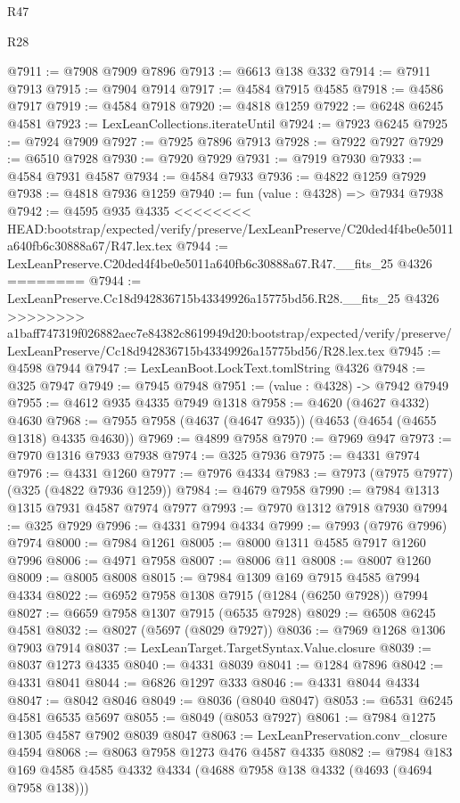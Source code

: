\begin{lexlean}{R47}
\begin{lexlean}{R28}
\begin{coremodule}
{{{{{{{{{{{{{{{{{{{{{{{{{{{{{{{{{{{{{{{{{{{{{{{{{{{{{{{{{{{{{{{{{{{{{{{{{{{{{{{{{{{{{{{{{{{{{{{{{{{{{{{{{{{{{{{{{{{{{{{{{{{{{{{{{{{{{@7911 := @7908 @7909 @7896
@7913 := @6613 @138 @332
@7914 := @7911 @7913
@7915 := @7904 @7914
@7917 := @4584 @7915 @4585
@7918 := @4586 @7917
@7919 := @4584 @7918
@7920 := @4818 @1259
@7922 := @6248 @6245 @4581
@7923 := LexLeanCollections.iterateUntil
@7924 := @7923 @6245
@7925 := @7924 @7909
@7927 := @7925 @7896 @7913
@7928 := @7922 @7927
@7929 := @6510 @7928
@7930 := @7920 @7929
@7931 := @7919 @7930
@7933 := @4584 @7931 @4587
@7934 := @4584 @7933
@7936 := @4822 @1259 @7929
@7938 := @4818 @7936 @1259
@7940 := fun (value : @4328) => @7934 @7938
@7942 := @4595 @935 @4335
<<<<<<<< HEAD:bootstrap/expected/verify/preserve/LexLeanPreserve/C20ded4f4be0e5011a640fb6c30888a67/R47.lex.tex
@7944 := LexLeanPreserve.C20ded4f4be0e5011a640fb6c30888a67.R47.__fits_25 @4326
========
@7944 := LexLeanPreserve.Cc18d942836715b43349926a15775bd56.R28.__fits_25 @4326
>>>>>>>> a1baff747319f026882aec7e84382c8619949d20:bootstrap/expected/verify/preserve/LexLeanPreserve/Cc18d942836715b43349926a15775bd56/R28.lex.tex
@7945 := @4598 @7944
@7947 := LexLeanBoot.LockText.tomlString @4326
@7948 := @325 @7947
@7949 := @7945 @7948
@7951 := (value : @4328) -> @7942 @7949
@7955 := @4612 @935 @4335 @7949 @1318
@7958 := @4620 (@4627 @4332) @4630
@7968 := @7955 @7958 (@4637 (@4647 @935)) (@4653 (@4654 (@4655 @1318) @4335 @4630))
@7969 := @4899 @7958
@7970 := @7969 @947
@7973 := @7970 @1316 @7933 @7938
@7974 := @325 @7936
@7975 := @4331 @7974
@7976 := @4331 @1260
@7977 := @7976 @4334
@7983 := @7973 (@7975 @7977) (@325 (@4822 @7936 @1259))
@7984 := @4679 @7958
@7990 := @7984 @1313 @1315 @7931 @4587 @7974 @7977
@7993 := @7970 @1312 @7918 @7930
@7994 := @325 @7929
@7996 := @4331 @7994 @4334
@7999 := @7993 (@7976 @7996) @7974
@8000 := @7984 @1261
@8005 := @8000 @1311 @4585 @7917 @1260 @7996
@8006 := @4971 @7958
@8007 := @8006 @11
@8008 := @8007 @1260
@8009 := @8005 @8008
@8015 := @7984 @1309 @169 @7915 @4585 @7994 @4334
@8022 := @6952 @7958 @1308 @7915 (@1284 (@6250 @7928)) @7994
@8027 := @6659 @7958 @1307 @7915 (@6535 @7928)
@8029 := @6508 @6245 @4581
@8032 := @8027 (@5697 (@8029 @7927))
@8036 := @7969 @1268 @1306 @7903 @7914
@8037 := LexLeanTarget.TargetSyntax.Value.closure
@8039 := @8037 @1273 @4335
@8040 := @4331 @8039
@8041 := @1284 @7896
@8042 := @4331 @8041
@8044 := @6826 @1297 @333
@8046 := @4331 @8044 @4334
@8047 := @8042 @8046
@8049 := @8036 (@8040 @8047)
@8053 := @6531 @6245 @4581 @6535 @5697
@8055 := @8049 (@8053 @7927)
@8061 := @7984 @1275 @1305 @4587 @7902 @8039 @8047
@8063 := LexLeanPreservation.conv_closure @4594
@8068 := @8063 @7958 @1273 @476 @4587 @4335
@8082 := @7984 @183 @169 @4585 @4585 @4332 @4334 (@4688 @7958 @138 @4332 (@4693 (@4694 @7958 @138)))
}}}}}}}}}}}}}}}}}}}}}}}}}}}}}}}}}}}}}}}}}}}}}}}}}}}}}}}}}}}}}}}}}}}}}}}}}}}}}}}}}}}}}}}}}}}}}}}}}}}}}}}}}}}}}}}}}}}}}}}}}}}}}}}}}}}}}
\end{coremodule}
\end{lexlean}
\end{lexlean}
